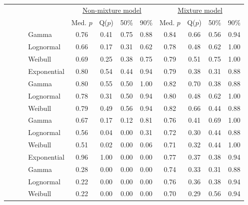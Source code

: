 \documentclass[useAMS,usenatbib,referee,12pt]{article}
\begin{document}
\begin{table}[ht]\centering\small
\begin{tabular}{l|l|l|l|cccc|cccc}
 \multicolumn{4}{c|}{ } & \multicolumn{4}{c|}{\underline{Non-mixture model}} & \multicolumn{4}{c}{\underline{Mixture model}} \\
 \multicolumn{4}{c|}{ } & Med. $p$ & Q($p$) & 50\% & 90\% & Med. $p$ & Q($p$) & 50\% & 90\% \\ 
  \hline
  \hline
 \parbox[t]{2mm}{} & \parbox[t]{2mm}{} & \parbox[t]{2mm}{} & Gamma & 0.76 & 0.41 & 0.75 & 0.88 & 0.84 & 0.66 & 0.56 & 0.94 \\ 
 & & &   Lognormal & 0.66 & 0.17 & 0.31 & 0.62 & 0.78 & 0.48 & 0.62 & 1.00  \\ 
 & & &   Weibull & 0.69 & 0.25 & 0.38 & 0.75 & 0.79 & 0.51 & 0.75 & 1.00 \\ 
 & & &   Exponential & 0.80 & 0.54 & 0.44 & 0.94 & 0.79 & 0.38 & 0.31 & 0.88  \\ 
 & & \parbox[t]{2mm}{} &  Gamma & 0.80 & 0.55 & 0.50 & 1.00 & 0.82 & 0.70 & 0.38 & 0.88 \\ 
 & & &   Lognormal & 0.78 & 0.31 & 0.50 & 0.94 & 0.80 & 0.48 & 0.62 & 1.00 \\ 
 & & &   Weibull & 0.79 & 0.49 & 0.56 & 0.94 & 0.82 & 0.66 & 0.44 & 0.88 \\ 
& \parbox[t]{2mm}{} & \parbox[t]{2mm}{} & Gamma & 0.67 & 0.17 & 0.12 & 0.81 & 0.76 & 0.41 & 0.69 & 1.00 \\ 
 & & &   Lognormal & 0.56 & 0.04 & 0.00 & 0.31 & 0.72 & 0.30 & 0.44 & 0.88 \\ 
 & & &   Weibull & 0.51 & 0.02 & 0.00 & 0.06 & 0.71 & 0.32 & 0.44 & 1.00 \\ 
 & & &   Exponential & 0.96 & 1.00 & 0.00 & 0.00 & 0.77 & 0.37 & 0.38 & 0.94 \\ 
 & & \parbox[t]{2mm}{} & Gamma & 0.28 & 0.00 & 0.00 & 0.00 & 0.74 & 0.33 & 0.31 & 0.88 \\ 
 & & &   Lognormal & 0.22 & 0.00 & 0.00 & 0.00 & 0.76 & 0.36 & 0.38 & 0.94 \\ 
 & & &   Weibull & 0.22 & 0.00 & 0.00 & 0.00 & 0.70 & 0.29 & 0.56 & 0.94 \\ 

\end{tabular}
\end{table}
\end{document}
